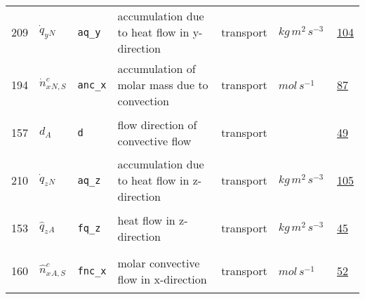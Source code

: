 \begin{longtable}{|p{1cm}|p{2.5cm}|p{4.5cm}|p{8cm}|p{3.0cm}|p{3cm}|p{1cm}|}
                 \\
            209
             & \hypertarget{"v:209"}{ $ {{\dot{q}_y}}{_{N}} $}
             & \verb|aq_y|
             & accumulation due to heat flow in y-direction
             & \begin{lay}transport \end{lay}
             & $ kg \,m^{2} \,s^{-3} \, $
             &                 \hyperlink{"e:104"}{ 104 }
                 \\
            194
             & \hypertarget{"v:194"}{ $ {{\dot{n}^c_x}}{_{N, S}} $}
             & \verb|anc_x|
             & accumulation of molar mass due to convection
             & \begin{lay}transport \end{lay}
             & $ mol \,s^{-1} \, $
             &                 \hyperlink{"e:87"}{ 87 }
                 \\
            157
             & \hypertarget{"v:157"}{ $ {d}{_{A}} $}
             & \verb|d|
             & flow direction of convective flow
             & \begin{lay}transport \end{lay}
             & $  $
             &                 \hyperlink{"e:49"}{ 49 }
                 \\
            210
             & \hypertarget{"v:210"}{ $ {{\dot{q}_z}}{_{N}} $}
             & \verb|aq_z|
             & accumulation due to heat flow in z-direction
             & \begin{lay}transport \end{lay}
             & $ kg \,m^{2} \,s^{-3} \, $
             &                 \hyperlink{"e:105"}{ 105 }
                 \\
            153
             & \hypertarget{"v:153"}{ $ {{\hat{q}_z}}{_{A}} $}
             & \verb|fq_z|
             & heat flow in z-direction
             & \begin{lay}transport \end{lay}
             & $ kg \,m^{2} \,s^{-3} \, $
             &                 \hyperlink{"e:45"}{ 45 }
                 \\
            160
             & \hypertarget{"v:160"}{ $ {{\hat{n}^c_x}}{_{A, S}} $}
             & \verb|fnc_x|
             & molar convective flow in x-direction
             & \begin{lay}transport \end{lay}
             & $ mol \,s^{-1} \, $
             &                 \hyperlink{"e:52"}{ 52 }

\end{longtable}
